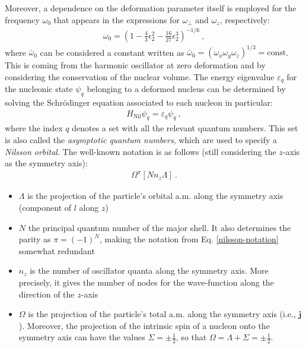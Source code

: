 Moreover, a dependence on the deformation parameter itself is employed for the frequency $\omega_0$ that appears in the expressions for $\omega_\perp$ and $\omega_z$, respectively:
\begin{align}
    \omega_0=\left(1-\frac{4}{3}\epsilon_2^2-\frac{16}{27}\epsilon_2^3\right)^{-1/6}\ ,
    \label{omega-0-oscillator-frequency}
\end{align}
where $\bar{\omega}_0$ can be considered a constant written as $\bar{\omega}_0=(\omega_x\omega_y\omega_z)^{1/3}=\text{const}$. This is coming from the harmonic oscillator at zero deformation and by considering the conservation of the nuclear volume. The energy eigenvalue $\varepsilon_q$ for the nucleonic state $\psi_q$ belonging to a deformed nucleus can be determined by solving the Schrödinger equation associated to each nucleon in particular:
\begin{align}
    H_\text{Nil}\psi_q=\varepsilon_q\psi_q\ ,
    \label{nilsson-schrodiner-equation}
\end{align}
where the index $q$ denotes a set with all the relevant quantum numbers. This set is also called the \emph{asymptotic quantum numbers}, which are used to specify a \emph{Nilsson orbital}. The well-known notation is as follows (still considering the $z$-axis as the symmetry axis):
\begin{align}
    \Omega^\pi\left[Nn_z\Lambda\right]\ .
    \label{nilsson-notation}
\end{align}
\begin{itemize}
    \item $\Lambda$ is the projection of the particle's orbital a.m. along the symmetry axis (component of $l$ along $z$)
    \item $N$ the principal quantum number of the major shell. It also determines the parity as $\pi=(-1)^N$, making the notation from Eq. \ref{nilsson-notation} somewhat redundant
    \item $n_z$ is the number of oscillator quanta along the symmetry axis. More precisely, it gives the number of nodes for the wave-function along the direction of the $z$-axis
    \item $\Omega$ is the projection of the particle's total a.m. along the symmetry axis (i.e., $\mathbf{j}$). Moreover, the projection of the intrinsic spin of a nucleon onto the symmetry axis can have the values $\Sigma=\pm\frac{1}{2}$, so that $\Omega=\Lambda+\Sigma=\pm\frac{1}{2}$.
\end{itemize}

